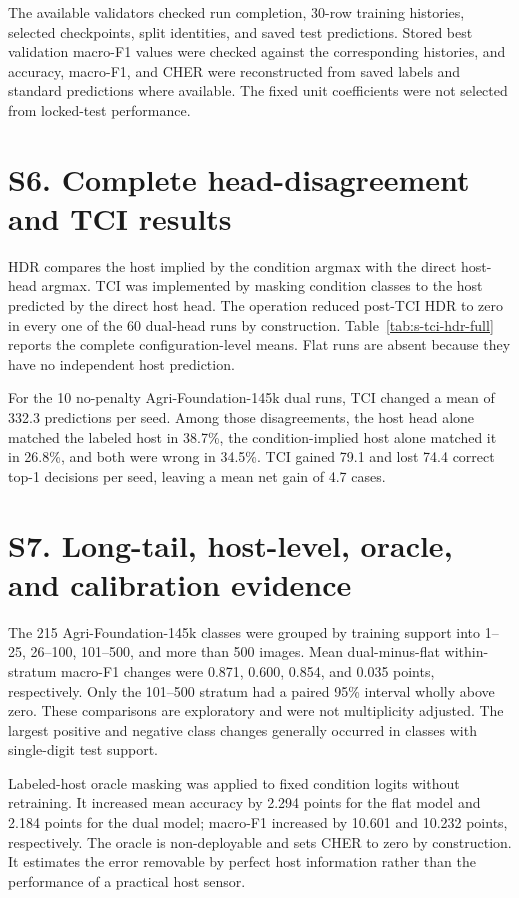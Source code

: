 \documentclass[preprint,12pt]{elsarticle}
\begin{document}
The available validators checked run completion, 30-row training histories,
selected checkpoints, split identities, and saved test predictions. Stored best
validation macro-F1 values were checked against the corresponding histories,
and accuracy, macro-F1, and CHER were reconstructed from saved labels and
standard predictions where available. The fixed unit coefficients were not
selected from locked-test performance.

\section*{S6. Complete head-disagreement and TCI results}

HDR compares the host implied by the condition argmax with the direct host-head
argmax. TCI was implemented by masking condition classes to the host predicted
by the direct host head. The operation reduced post-TCI HDR to zero in every
one of the 60 dual-head runs by construction. Table~\ref{tab:s-tci-hdr-full}
reports the complete configuration-level means. Flat runs are absent because
they have no independent host prediction.



For the 10 no-penalty Agri-Foundation-145k dual runs, TCI changed a mean of
332.3 predictions per seed. Among those disagreements, the host head alone
matched the labeled host in 38.7\%, the condition-implied host alone matched it
in 26.8\%, and both were wrong in 34.5\%. TCI gained 79.1 and lost 74.4 correct
top-1 decisions per seed, leaving a mean net gain of 4.7 cases.

\section*{S7. Long-tail, host-level, oracle, and calibration evidence}

The 215 Agri-Foundation-145k classes were grouped by training support into
1--25, 26--100, 101--500, and more than 500 images. Mean dual-minus-flat
within-stratum macro-F1 changes were 0.871, 0.600, 0.854, and 0.035 points,
respectively. Only the 101--500 stratum had a paired 95\% interval wholly above
zero. These comparisons are exploratory and were not multiplicity adjusted.
The largest positive and negative class changes generally occurred in classes
with single-digit test support.

Labeled-host oracle masking was applied to fixed condition logits without
retraining. It increased mean accuracy by 2.294 points for the flat model and
2.184 points for the dual model; macro-F1 increased by 10.601 and 10.232 points,
respectively. The oracle is non-deployable and sets CHER to zero by construction.
It estimates the error removable by perfect host information rather than the
performance of a practical host sensor.
\end{document}
